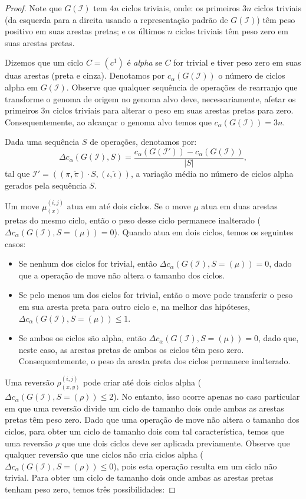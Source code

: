\begin{proof}
Note que $G(\mathcal{I})$ tem $4n$ ciclos triviais, onde: os primeiros $3n$ ciclos triviais (da esquerda para a direita usando a representação padrão de $G(\mathcal{I})$) têm peso positivo em suas arestas pretas; e os últimos $n$ ciclos triviais têm peso zero em suas arestas pretas.

Dizemos que um ciclo $C=(c^1)$ é \emph{alpha} se $C$ for trivial e tiver peso zero em suas duas arestas (preta e cinza). Denotamos por $c_{\alpha}(G(\mathcal{I}))$ o número de ciclos alpha em $G(\mathcal{I})$. Observe que qualquer sequência de operações de rearranjo que transforme o genoma de origem no genoma alvo deve, necessariamente, afetar os primeiros $3n$ ciclos triviais para alterar o peso em suas arestas pretas para zero. Consequentemente, ao alcançar o genoma alvo temos que $c_{\alpha}(G(\mathcal{I})) = 3n$.

Dada uma sequência $S$ de operações, denotamos por: $$\Delta c_{\alpha}(G(\mathcal{I}), S) = \frac{c_{\alpha}(G(\mathcal{I'})) - c_{\alpha}(G(\mathcal{I}))}{|S|},$$ tal que $\mathcal{I'} = ((\pi,\breve\pi) \cdot S,(\iota,\breve\iota))$, a variação média no número de ciclos alpha gerados pela sequência $S$.

Um move $\mu_{(x)}^{(i,j)}$ atua em até dois ciclos. Se o move $\mu$ atua em duas arestas pretas do mesmo ciclo, então o peso desse ciclo permanece inalterado ($\Delta c_{\alpha}(G(\mathcal{I}), S=(\mu)) = 0$). Quando atua em dois ciclos, temos os seguintes casos:
\begin{itemize}
  \item Se nenhum dos ciclos for trivial, então $\Delta c_{\alpha}(G(\mathcal{I}), S=(\mu)) = 0$, dado que a operação de move não altera o tamanho dos ciclos.
  \item Se pelo menos um dos ciclos for trivial, então o move pode transferir o peso em sua aresta preta para outro ciclo e, na melhor das hipóteses, $\Delta c_{\alpha}(G(\mathcal{I}), S=(\mu)) \le 1$.
  \item Se ambos os ciclos são alpha, então $\Delta c_{\alpha}(G(\mathcal{I}), S=(\mu)) = 0$, dado que, neste caso, as arestas pretas de ambos os ciclos têm peso zero. Consequentemente, o peso da aresta preta dos ciclos permanece inalterado.
\end{itemize}

Uma reversão $\rho_{(x,y)}^{(i,j)}$ pode criar até dois ciclos alpha ($\Delta c_{\alpha}(G(\mathcal{I}), S=(\rho)) \le 2$). No entanto, isso ocorre apenas no caso particular em que uma reversão divide um ciclo de tamanho dois onde ambas as arestas pretas têm peso zero. Dado que uma operação de move não altera o tamanho dos ciclos, para obter um ciclo de tamanho dois com tal característica, temos que uma reversão $\rho$ que une dois ciclos deve ser aplicada previamente. Observe que qualquer reversão que une ciclos não cria ciclos alpha ($\Delta c_{\alpha}(G(\mathcal{I}), S=(\rho)) \le 0$), pois esta operação resulta em um ciclo não trivial. Para obter um ciclo de tamanho dois onde ambas as arestas pretas tenham peso zero, temos três possibilidades:


\end{proof}
